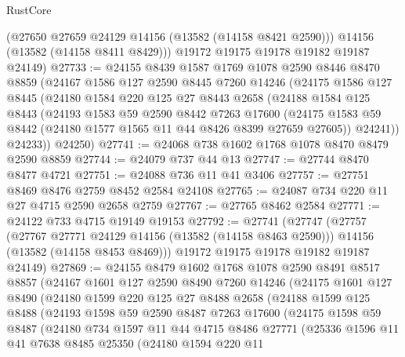 \begin{lexlean}{RustCore}
\begin{coremodule}
        (@27650 @27659 @24129 @14156 (@13582 (@14158 @8421 @2590)))
        @14156
        (@13582 (@14158 @8411 @8429)))
      @19172
      @19175
      @19178
      @19182
      @19187
      @24149)
@27733 := @24155
    @8439
    @1587
    @1769
    @1078
    @2590
    @8446
    @8470
    @8859
    (@24167
      @1586
      @127
      @2590
      @8445
      @7260
      @14246
      (@24175
        @1586
        @127
        @8445
        (@24180
          @1584
          @220
          @125
          @27
          @8443
          @2658
          (@24188
            @1584
            @125
            @8443
            (@24193
              @1583
              @59
              @2590
              @8442
              @7263
              @17600
              (@24175 @1583 @59 @8442 (@24180 @1577 @1565 @11 @44 @8426 @8399 @27659 @27605))
              @24241))
          @24233))
      @24250)
@27741 := @24068 @738 @1602 @1768 @1078 @8470 @8479 @2590 @8859
@27744 := @24079 @737 @44 @13
@27747 := @27744 @8470 @8477 @4721
@27751 := @24088 @736 @11 @41 @3406
@27757 := @27751 @8469 @8476 @2759 @8452 @2584 @24108
@27765 := @24087 @734 @220 @11 @27 @4715 @2590 @2658 @2759
@27767 := @27765 @8462 @2584
@27771 := @24122 @733 @4715 @19149 @19153
@27792 := @27741
    (@27747
      (@27757
        (@27767 @27771 @24129 @14156 (@13582 (@14158 @8463 @2590)))
        @14156
        (@13582 (@14158 @8453 @8469)))
      @19172
      @19175
      @19178
      @19182
      @19187
      @24149)
@27869 := @24155
    @8479
    @1602
    @1768
    @1078
    @2590
    @8491
    @8517
    @8857
    (@24167
      @1601
      @127
      @2590
      @8490
      @7260
      @14246
      (@24175
        @1601
        @127
        @8490
        (@24180
          @1599
          @220
          @125
          @27
          @8488
          @2658
          (@24188
            @1599
            @125
            @8488
            (@24193
              @1598
              @59
              @2590
              @8487
              @7263
              @17600
              (@24175
                @1598
                @59
                @8487
                (@24180
                  @734
                  @1597
                  @11
                  @44
                  @4715
                  @8486
                  @27771
                  (@25336
                    @1596
                    @11
                    @41
                    @7638
                    @8485
                    @25350
                    (@24180
                      @1594
                      @220
                      @11

\end{coremodule}
\end{lexlean}
